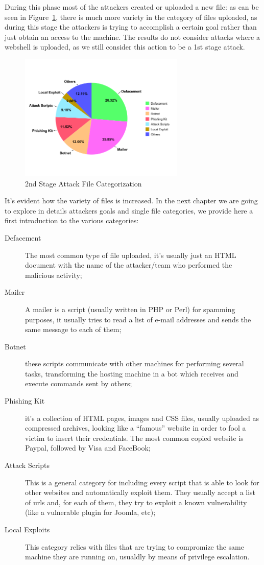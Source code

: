 During this phase most of the attackers created or uploaded a new file: as can be seen in Figure~\ref{fig:2ndStageAttack}, there is much more variety in the category of files uploaded, as during this stage the attackers is trying to accomplish a certain goal rather than just obtain an access to the machine. The results do not consider attacks where a webshell is uploaded, as we still consider this action to be a 1st stage attack.

\begin{figure}[tbh]
\centerline{\includegraphics[width=0.7\textwidth]{Images/2ndStageAttack.png}}
\caption{2nd Stage Attack File Categorization\label{fig:2ndStageAttack}}
\end{figure}

It's evident how the variety of files is increased. In the next chapter we are going to explore in details attackers goals and single file categories, we provide here a first introduction to the various categories:

\begin{description}
\item[Defacement] The most common type of file uploaded, it's usually just an HTML document with the name of the attacker/team who performed the malicious activity;
\item[Mailer] A mailer is a script (usually written in PHP or Perl) for spamming purposes, it usually tries to read a list of e-mail addresses and sends the same message to each of them;
\item[Botnet] these scripts communicate with other machines for performing several tasks, transforming the hosting machine in a bot which receives and execute commands sent by others;
\item[Phishing Kit] it's a collection of HTML pages, images and CSS files, usually uploaded as compressed archives, looking like a ``famous'' website in order to fool a victim to insert their credentials. The most common copied website is Paypal, followed by Visa and FaceBook;
\item[Attack Scripts] This is a general category for including every script that is able to look for other websites and automatically exploit them. They usually accept a list of urls and, for each of them, they try to exploit a known vulnerability (like a vulnerable plugin for Joomla, etc);
\item[Local Exploits] This category relies with files that are trying to compromize the same machine they are running on, usualdly by means of privilege escalation.
\end{description}

